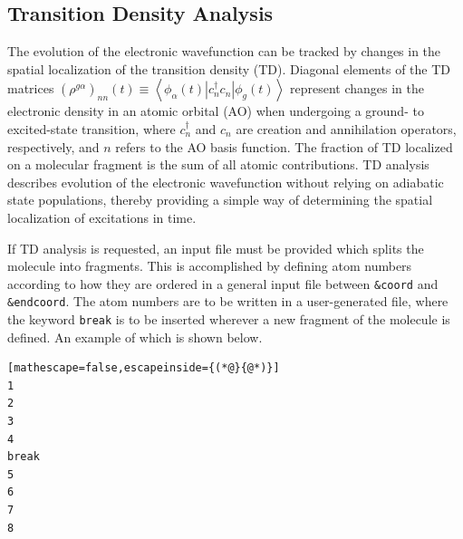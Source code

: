\documentclass[letterpaper,12pt,titlepage]{article}
\begin{document}
\subsection{Transition Density Analysis}
The evolution of the electronic wavefunction can be tracked by changes in the spatial localization of the transition density (TD).  Diagonal elements of the TD matrices $\left(\rho^{g\alpha}\right)_{nn}\left(t\right)\equiv\left<\phi_{\alpha}\left(t\right)|c_{n}^{\dagger}c_{n}|\phi_{g}\left(t\right)\right>$ represent changes in the electronic density in an atomic orbital (AO) when undergoing a ground- to excited-state transition, where $c_{n}^{\dagger}$ and $c_{n}$ are creation and annihilation operators, respectively, and $n$ refers to the AO basis function.\cite{wu2006exciton}  The fraction of TD localized on a molecular fragment is the sum of all atomic contributions.\cite{baer2006beyond}  TD analysis describes evolution of the electronic wavefunction without relying on adiabatic state populations, thereby providing a simple way of determining the spatial localization of excitations in time.\cite{fernandez2012identification,fernandez2012shishiodoshi,nelson2013conformational}  

If TD analysis is requested, an input file must be provided which splits the molecule into fragments.   This is accomplished by defining atom numbers according to how they are ordered in a general input file between \verb+&coord+ and \verb+&endcoord+.  The atom numbers are to be written in a user-generated file, where the keyword \verb+break+ is to be inserted wherever a new fragment of the molecule is defined.  An example of which is shown below.
\begin{lstlisting}[mathescape=false,escapeinside={(*@}{@*)}]
1
2
3
4
break
5
6
7
8
\end{lstlisting}
\end{document}

